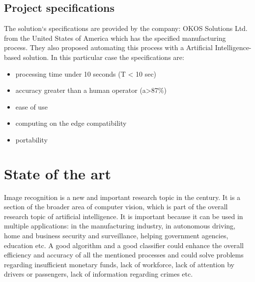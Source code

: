 \documentclass[12pt,a4paper,twoside]{report}
\begin{document}
\section{Project specifications}
The solution`s specifications are provided by the company: OKOS Solutions Ltd. from the United States of America which has the specified manufacturing process. They also proposed automating this process with a Artificial Intelligence-based solution. In this particular case the specifications are:
\begin{itemize}
    \item processing time under 10 seconds (T < 10 sec)
    \item accuracy greater than a human operator (a>87\%)\cite{article-studyhumandeep}
    \item ease of use
    \item computing on the edge compatibility
    \item portability
\end{itemize}

\chapter{State of the art}
\label{ch:stateoftheart}

Image recognition is a new and important research topic in the  century. It is a section of the broader area of computer vision, which is part of the overall research topic of artificial intelligence. It is important because it can be used in multiple applications: in the manufacturing industry, in autonomous driving, home and business security and surveillance, helping government agencies, education etc. A good algorithm and a good classifier could enhance the overall efficiency and accuracy of all the mentioned processes and could solve problems regarding insufficient monetary funds, lack of workforce, lack of attention by drivers or passengers, lack of information regarding crimes etc. \par
\end{document}
